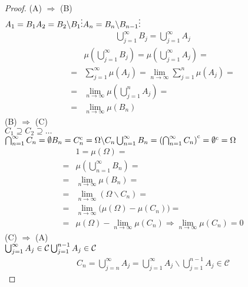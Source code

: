 \begin{proof}
(A) $ \Rightarrow $ (B)\\
$ A_1=B_1\\
A_2=B_2\backslash B_1\\
\vdots\\
A_n=B_n\backslash B_{n-1}\\
\vdots $\\
\begin{gather*}
\bigcup_{j=1}^\infty B_j=\bigcup_{j=1}^\infty A_j
\end{gather*}
\begin{align*}
&\mu \left(\bigcup_{j=1}^\infty B_j\right)
=
\mu \left(\bigcup_{j=1}^\infty A_j\right)
=\\=&
\sum_{j=1}^\infty \mu \left(A_j\right)
=
\lim\limits_{n\to\infty} \sum_{j=1}^n \mu \left(A_j\right)
=\\=&
\lim\limits_{n\to\infty} \mu \left(\bigcup_{j=1}^n A_j\right)
=\\=&
\lim\limits_{n\to\infty} \mu \left(B_n\right)
\end{align*}
(B) $ \Rightarrow $ (C)\\
$ C_1\supseteq C_2\supseteq\dots $\\
$ \bigcap_{n=1}^\infty C_n=\emptyset \\
B_n=C_n^\mathrm c=\Omega\backslash C_n\\
\bigcup_{n=1}^\infty B_n=\left(\bigcap_{n=1}^\infty C_n\right)^\mathrm c=\emptyset^\mathrm c=\Omega$
\begin{align*}
&1=\mu \left(\Omega\right)
=\\=&
\mu \left(\bigcup_{n=1}^\infty B_n\right)
=\\=&
\lim\limits_{n\to\infty} \mu \left(B_n\right)
=\\=&
\lim\limits_{n\to\infty} \left(\Omega\backslash C_n\right)
=\\=&
\lim\limits_{n\to\infty} \bigl(\mu\left(\Omega\right)-\mu\left( C_n\right)\bigr)
=\\=&
\mu\left(\Omega\right)-\lim\limits_{n\to\infty} \mu\left( C_n\right)
\Rightarrow
\lim\limits_{n\to\infty} \mu \left(C_n\right)=0
\end{align*}
(C) $ \Rightarrow $ (A)\\
$ \bigcup_{j=1}^\infty A_j \in\mathcal C\\
\bigcup_{j=1}^{n-1} A_j \in\mathcal C$
\begin{gather*}
C_n
=
\bigcup_{j=n}^\infty A_j
=
\bigcup_{j=1}^\infty A_j\backslash\bigcup_{j=1}^{n-1} A_j\in\mathcal C
\end{gather*}

\end{proof}
